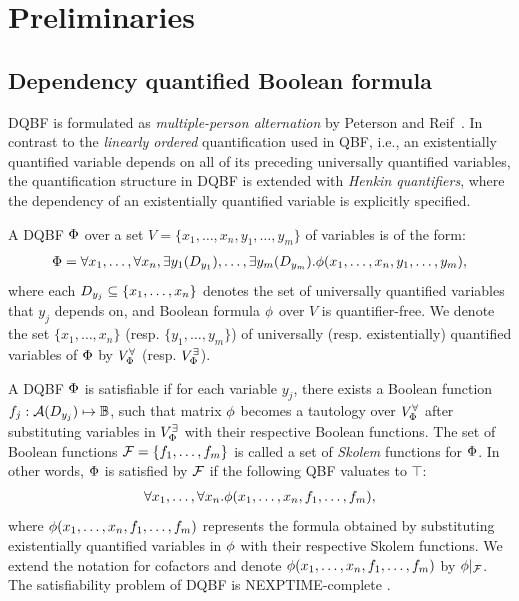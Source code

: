 \section{Preliminaries}
\label{sect:dssat-preliminaries}

\subsection{Dependency quantified Boolean formula}
\label{sect:dssat-dqbf}
DQBF is formulated as \textit{multiple-person alternation} by Peterson and Reif~\cite{Peterson1979}.
In contrast to the \textit{linearly ordered} quantification used in QBF,
i.e., an existentially quantified variable depends on all of its preceding universally quantified variables,
the quantification structure in DQBF is extended with \textit{Henkin quantifiers},
where the dependency of an existentially quantified variable is explicitly specified.

A DQBF $\Phi$ over a set $V=\{x_1,\ldots,x_n,y_1,\ldots,y_m\}$ of variables is of the form:
\begin{align*}
    \Phi=\forall x_1,\ldots,\forall x_n,\exists y_1(D_{y_1}),\ldots,\exists y_m(D_{y_m}).\phi(x_1,\ldots,x_n,y_1,\ldots,y_m),
\end{align*}
where each $D_{y_j}\subseteq\{x_1,\ldots,x_n\}$ denotes the set of universally quantified variables that $y_j$ depends on,
and Boolean formula $\phi$ over $V$ is quantifier-free.
We denote the set $\{x_1,\ldots,x_n\}$ (resp. $\{y_1,\ldots,y_m\}$) of universally (resp. existentially) quantified variables of $\Phi$ by $V_{\Phi}^{\forall}$ (resp. $V_{\Phi}^{\exists}$).

A DQBF $\Phi$ is satisfiable if for each variable $y_j$,
there exists a Boolean function $f_j:\mathcal{A}(D_{y_j})\mapsto\mathbb{B}$,
such that matrix $\phi$ becomes a tautology over $V_{\Phi}^{\forall}$
after substituting variables in $V_{\Phi}^{\exists}$ with their respective Boolean functions.
The set of Boolean functions $\mathcal{F}=\{f_1,\ldots,f_m\}$ is called a set of \textit{Skolem} functions for $\Phi$.
In other words, $\Phi$ is satisfied by $\mathcal{F}$ if the following QBF valuates to $\top$:
\begin{align}
    \label{eq:dssat-dqbf-satisfiable}
    \forall x_1,\ldots,\forall x_n.\phi(x_1,\ldots,x_n,f_1,\ldots,f_m),
\end{align}
where $\phi(x_1,\ldots,x_n,f_1,\ldots,f_m)$ represents the formula obtained by substituting existentially quantified variables in $\phi$ with their respective Skolem functions.
We extend the notation for cofactors and denote $\phi(x_1,\ldots,x_n,f_1,\ldots,f_m)$ by $\phi|_{\mathcal{F}}$.
The satisfiability problem of DQBF is NEXPTIME-complete \cite{Peterson2001}.

